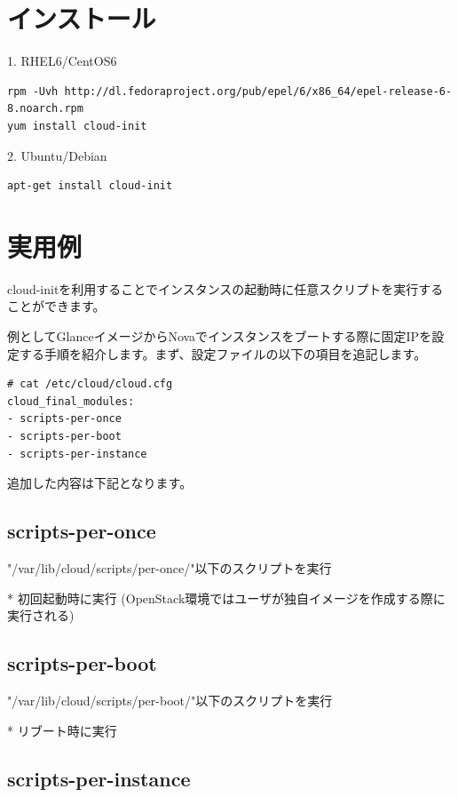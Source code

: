 \documentclass[9pt,b5paper,tombo,openany,dvipdfmx]{jsbook}
\begin{document}
\section{インストール}

1. RHEL6/CentOS6

\begin{lstlisting}
rpm -Uvh http://dl.fedoraproject.org/pub/epel/6/x86_64/epel-release-6-8.noarch.rpm
yum install cloud-init
\end{lstlisting}

2. Ubuntu/Debian

\begin{lstlisting}
apt-get install cloud-init
\end{lstlisting}

\section{実用例}

cloud-initを利用することでインスタンスの起動時に任意スクリプトを実行することができます。

例としてGlanceイメージからNovaでインスタンスをブートする際に固定IPを設定する手順を紹介します。まず、設定ファイルの以下の項目を追記します。

\begin{lstlisting}
# cat /etc/cloud/cloud.cfg
cloud_final_modules:
- scripts-per-once
- scripts-per-boot
- scripts-per-instance
\end{lstlisting}

追加した内容は下記となります。

\subsection{scripts-per-once}

"/var/lib/cloud/scripts/per-once/"以下のスクリプトを実行

* 初回起動時に実行 (OpenStack環境ではユーザが独自イメージを作成する際に実行される)

\subsection{scripts-per-boot}

"/var/lib/cloud/scripts/per-boot/"以下のスクリプトを実行

* リブート時に実行

\subsection{scripts-per-instance}
\end{document}
